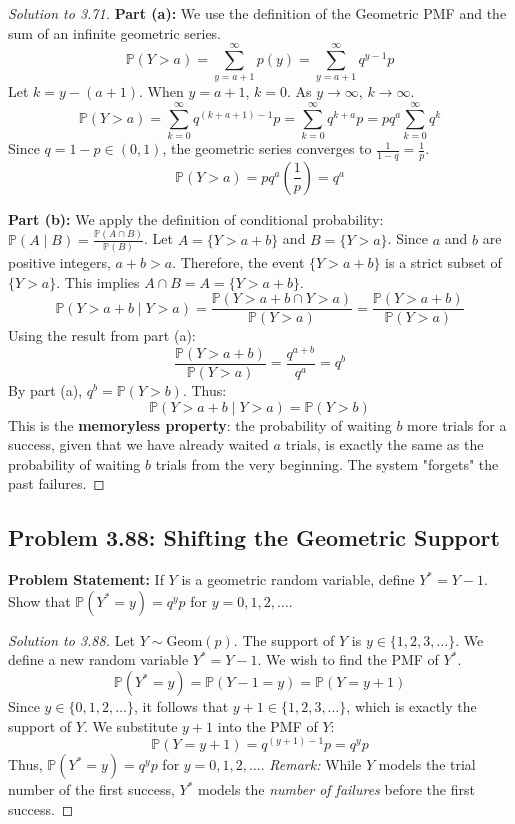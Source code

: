 \documentclass[11pt, letterpaper]{article}
\theoremstyle{definition}
\theoremstyle{remark}
\newcommand{\Prob}{\mathbb{P}}
\begin{document}
\begin{proof}[Solution to 3.71]
\textbf{Part (a):} We use the definition of the Geometric PMF and the sum of an infinite geometric series.
\[ \Prob(Y > a) = \sum_{y=a+1}^\infty p(y) = \sum_{y=a+1}^\infty q^{y-1} p \]
Let $k = y - (a+1)$. When $y = a+1$, $k = 0$. As $y \to \infty$, $k \to \infty$.
\[ \Prob(Y > a) = \sum_{k=0}^\infty q^{(k+a+1)-1} p = \sum_{k=0}^\infty q^{k+a} p = p q^a \sum_{k=0}^\infty q^k \]
Since $q = 1-p \in (0,1)$, the geometric series converges to $\frac{1}{1-q} = \frac{1}{p}$.
\[ \Prob(Y > a) = p q^a \left( \frac{1}{p} \right) = q^a \]

\textbf{Part (b):} We apply the definition of conditional probability: $\Prob(A \mid B) = \frac{\Prob(A \cap B)}{\Prob(B)}$.
Let $A = \{Y > a+b\}$ and $B = \{Y > a\}$. Since $a$ and $b$ are positive integers, $a+b > a$. Therefore, the event $\{Y > a+b\}$ is a strict subset of $\{Y > a\}$. 
This implies $A \cap B = A = \{Y > a+b\}$.
\[ \Prob(Y > a+b \mid Y > a) = \frac{\Prob(Y > a+b \cap Y > a)}{\Prob(Y > a)} = \frac{\Prob(Y > a+b)}{\Prob(Y > a)} \]
Using the result from part (a):
\[ \frac{\Prob(Y > a+b)}{\Prob(Y > a)} = \frac{q^{a+b}}{q^a} = q^b \]
By part (a), $q^b = \Prob(Y > b)$. Thus:
\[ \Prob(Y > a+b \mid Y > a) = \Prob(Y > b) \]
This is the \textbf{memoryless property}: the probability of waiting $b$ more trials for a success, given that we have already waited $a$ trials, is exactly the same as the probability of waiting $b$ trials from the very beginning. The system "forgets" the past failures.
\end{proof}

\subsection{Problem 3.88: Shifting the Geometric Support}
\textbf{Problem Statement:} If $Y$ is a geometric random variable, define $Y^* = Y - 1$. Show that $\Prob(Y^* = y) = q^y p$ for $y = 0, 1, 2, \dots$.

\begin{proof}[Solution to 3.88]
Let $Y \sim \mathrm{Geom}(p)$. The support of $Y$ is $y \in \{1, 2, 3, \dots\}$.
We define a new random variable $Y^* = Y - 1$. We wish to find the PMF of $Y^*$.
\[ \Prob(Y^* = y) = \Prob(Y - 1 = y) = \Prob(Y = y + 1) \]
Since $y \in \{0, 1, 2, \dots\}$, it follows that $y+1 \in \{1, 2, 3, \dots\}$, which is exactly the support of $Y$. We substitute $y+1$ into the PMF of $Y$:
\[ \Prob(Y = y+1) = q^{(y+1)-1} p = q^y p \]
Thus, $\Prob(Y^* = y) = q^y p$ for $y = 0, 1, 2, \dots$. 
\textit{Remark:} While $Y$ models the trial number of the first success, $Y^*$ models the \textit{number of failures} before the first success.
\end{proof}
\end{document}
